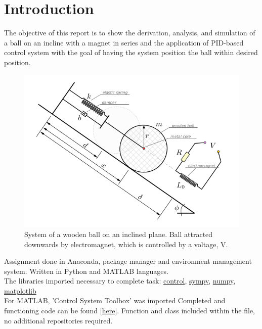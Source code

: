 
\section{Introduction}%
\label{Introduction}

The objective of this report is to show the derivation, analysis, and simulation of a ball on an incline with a magnet in series and the application of PID-based control system with the goal of having the system position the ball within desired position.

\begin{figure}[H]
	\centering
	\captionsetup{justification=centering}
	\includegraphics[width=0.8\linewidth]{imgs/problemFigure.png}
	\caption{System of a wooden ball on an inclined plane. Ball attracted downwards by electromagnet, which is controlled by a voltage, V.}%
	\label{fig:14}
\end{figure}


Assignment done in Anaconda, package manager and environment management system. Written in Python and MATLAB languages.\\ The libraries imported necessary to complete task: \href{https://anaconda.org/conda-forge/control}{control}, \href{https://anaconda.org/anaconda/sympy}{sympy}, \href{https://anaconda.org/anaconda/numpy}{numpy}, \href{https://anaconda.org/conda-forge/matplotlib}{matplotlib} \\
For MATLAB, 'Control System Toolbox' was imported
Completed and functioning code can be found \href{https://github.com/ELE2024-Controls/Coursework}{[here]}. Function and class included within the file, no additional repositories required.